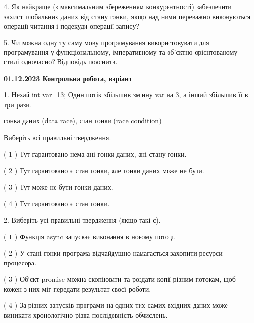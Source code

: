 \documentclass[12pt, ukrainian]{article}
\begin{document}
\begin {large}
{\vspace{5mm}
4. Як найкраще (з максимальним збереженням конкурентності) забезпечити захист глобальних даних від стану гонки, якщо над ними переважно виконуються операції читання і подекуди операції запису?



\vspace{5mm}
5. Чи можна одну ту саму мову програмування використовувати для програмування у функціональному, імперативному та об’єктно-орієнтованому стилі одночасно? Відповідь пояснити.
}
\end {large}

\vspace{4mm}
\newpage
\begin {large}

\textbf{01.12.2023 Контрольна робота, варіант  }\par


{
1. Нехай int var=13; Один потік збільшив змінну var на 3, а інший збільшив її в три рази.

гонка даних (data race), стан гонки (race condition)

Виберіть всі правильні твердження.\par
\vspace{2mm}
( 1 ) Тут гарантовано нема ані гонки даних, ані стану гонки.%

( 2 ) Тут гарантовано є стан гонки, але гонки даних може не бути.%

( 3 ) Тут може не бути гонки даних.%

( 4 ) Тут гарантовано є стан гонки.%


\vspace{5mm}
2. Виберіть усі правильні твердження (якщо такі є).\par
\vspace{2mm}

( 1 ) Функція async запускає виконання в новому потоці.%

( 2 ) У стані гонки програма відчайдушно намагається захопити ресурси процесора.%

( 3 ) Об’єкт promise можна скопіювати та роздати копії різним потокам, щоб кожен з них міг передати результат своєї роботи.%

( 4 ) За різних запусків програми на одних тих самих вхідних даних може виникати хронологічно різна послідовність обчислень.%


}
\end{large}
\end{document}
